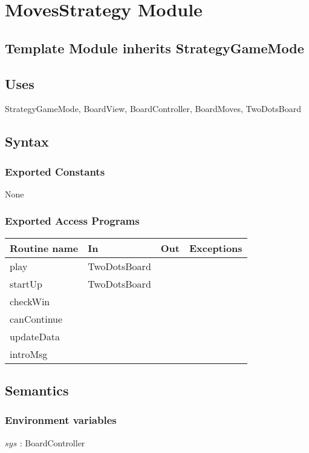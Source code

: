 \documentclass[12pt]{article}
\begin{document}
\newpage

\section* {MovesStrategy Module}

\subsection* {Template Module inherits StrategyGameMode}


\subsection{Uses}
StrategyGameMode, BoardView, BoardController, BoardMoves, TwoDotsBoard

\subsection* {Syntax}

\subsubsection* {Exported Constants}

None

\subsubsection* {Exported Access Programs}

\begin{tabular}{| l | l | l | p{6cm} |}
\hline
\textbf{Routine name} & \textbf{In} & \textbf{Out} & \textbf{Exceptions}\\
\hline
play & TwoDotsBoard & & \\
\hline
startUp & TwoDotsBoard & & \\
\hline
checkWin & & & \\
\hline
canContinue &  & & \\
\hline
updateData &  & & \\
\hline
introMsg & & & \\
\hline
\end{tabular}

\subsection* {Semantics}

\subsubsection* {Environment variables}
\noindent $sys$ : BoardController\\
\end{document}
